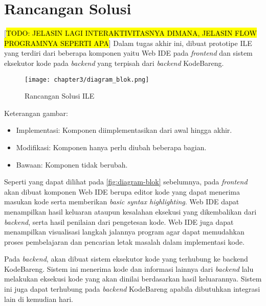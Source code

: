 \section{Rancangan Solusi}
 [\hl{TODO: JELASIN LAGI INTERAKTIVITASNYA DIMANA, JELASIN FLOW PROGRAMNYA SEPERTI APA}]
Dalam tugas akhir ini, dibuat prototipe ILE yang terdiri dari beberapa komponen yaitu Web IDE pada \textit{frontend} dan sistem eksekutor kode pada \textit{backend} yang terpisah dari \textit{backend} KodeBareng.

\begin{figure}[H]
  \centering
  \texttt{[image: chapter3/diagram\_blok.png]}
  \caption{Rancangan Solusi ILE} \label{fig:diagram-blok}
\end{figure}

Keterangan gambar:
\begin{itemize}
  \setlength\itemsep{-0.2cm}
  \item Implementasi: Komponen diimplementasikan dari awal hingga akhir.
  \item Modifikasi: Komponen hanya perlu diubah beberapa bagian.
  \item Bawaan: Komponen tidak berubah.
\end{itemize}

Seperti yang dapat dilihat pada \autoref{fig:diagram-blok} sebelumnya, pada \textit{frontend} akan dibuat komponen Web IDE berupa editor kode yang dapat menerima masukan kode serta memberikan \textit{basic syntax highlighting}. Web IDE dapat menampilkan hasil keluaran ataupun kesalahan eksekusi yang dikembalikan dari \textit{backend}, serta hasil penilaian dari pengetesan kode. Web IDE juga dapat menampilkan visualisasi langkah jalannya program agar dapat memudahkan proses pembelajaran dan pencarian letak masalah dalam implementasi kode.

Pada \textit{backend}, akan dibuat sistem eksekutor kode yang terhubung ke backend KodeBareng. Sistem ini menerima kode dan informasi lainnya dari \textit{backend} lalu melakukan eksekusi kode yang akan dinilai berdasarkan hasil keluarannya. Sistem ini juga dapat terhubung pada \textit{backend} KodeBareng apabila dibutuhkan integrasi lain di kemudian hari.

